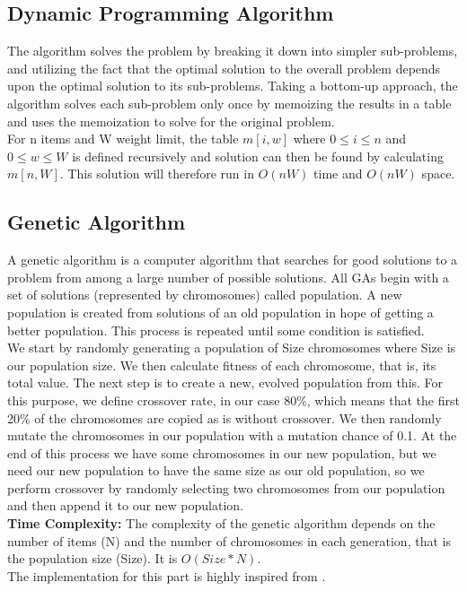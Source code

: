 \documentclass[a4paper, 11pt]{article}
\begin{document}
\subsection{Dynamic Programming Algorithm}
The algorithm solves the problem by breaking it down into simpler sub-problems, and utilizing the fact that the optimal solution to the overall problem depends upon the optimal solution to its sub-problems. Taking a bottom-up approach, the algorithm solves each sub-problem only once by memoizing the results in a table and uses the memoization to solve for the original problem.\\
For n items and W weight limit, the table $m[i,w]$ where $0\leq i\leq n$ and $0\leq w\leq W$ is defined recursively and solution can then be found by calculating $m[n,W]$. This solution will therefore run in $O(nW)$ time and $O(nW)$ space.

\subsection{Genetic Algorithm}
A genetic algorithm is a computer algorithm that searches for good solutions to a problem
from among a large number of possible solutions. \cite{c1} All GAs begin with a set of solutions
(represented by chromosomes) called population. A new population is created from
solutions of an old population in hope of getting a better population. This process is
repeated until some condition is satisfied. \\ We start by randomly generating a population of Size chromosomes where Size is our population size. We then calculate fitness of each chromosome, that is, its total value. The next step is to create a new, evolved population from this. For this purpose, we define crossover rate, in our case 80\%, which means that the first 20\% of the chromosomes are copied as is without crossover. We then randomly mutate the chromosomes in our population with a mutation chance of 0.1. At the end of this process we have some chromosomes in our new population, but we need our new population to have the same size as our old population, so we perform crossover by randomly selecting two chromosomes from our population and then append it to our new population. \\
\textbf{Time Complexity:} The complexity of the genetic algorithm depends on the number of items (N) and the
number of chromosomes in each generation, that is the population size (Size). It is $O(Size*N)$. \\
The implementation for this part is highly inspired from \cite{genetic}. 
\end{document}
